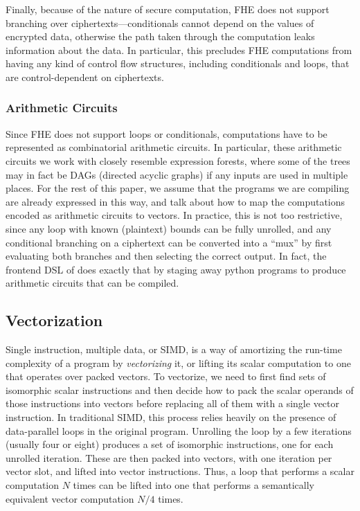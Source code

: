Finally, because of the nature of secure computation, FHE does not support branching over ciphertexts---conditionals cannot depend on the values of encrypted data, otherwise the path taken through the computation leaks information about the data. 
In particular, this precludes FHE computations from having any kind of control flow structures, including conditionals and loops, that are control-dependent on ciphertexts.

\subsubsection{Arithmetic Circuits}%
Since FHE does not support loops or conditionals, computations have to be represented as combinatorial arithmetic circuits.
In particular, these arithmetic circuits we work with closely resemble expression forests, where some of the trees may in fact be DAGs (directed acyclic graphs) if any inputs are used in multiple places.
For the rest of this paper, we assume that the programs we are compiling are already expressed in this way, and talk about how to map the computations encoded as arithmetic circuits to vectors.
In practice, this is not too restrictive, since any loop with known (plaintext) bounds can be fully unrolled, and any conditional branching on a ciphertext can be converted into a ``mux'' by first evaluating both branches and then selecting the correct output.
In fact, the frontend DSL of \system does exactly that by staging away python programs to produce arithmetic circuits that can be compiled.

\subsection{Vectorization}
Single instruction, multiple data, or SIMD, is a way of amortizing the run-time complexity of a program by {\em vectorizing} it, or lifting its scalar computation to one that operates over packed vectors.
To vectorize, we need to first find sets of isomorphic scalar instructions and then decide how to pack the scalar operands of those instructions into vectors before replacing all of them with a single vector instruction.
In traditional SIMD, this process relies heavily on the presence of data-parallel loops in the original program.
Unrolling the loop by a few iterations (usually four or eight) produces a set of isomorphic instructions, one for each unrolled iteration.
These are then packed into vectors, with one iteration per vector slot, and lifted into vector instructions.
Thus, a loop that performs a scalar computation $N$ times can be lifted into one that performs a semantically equivalent vector computation $N/4$ times.


